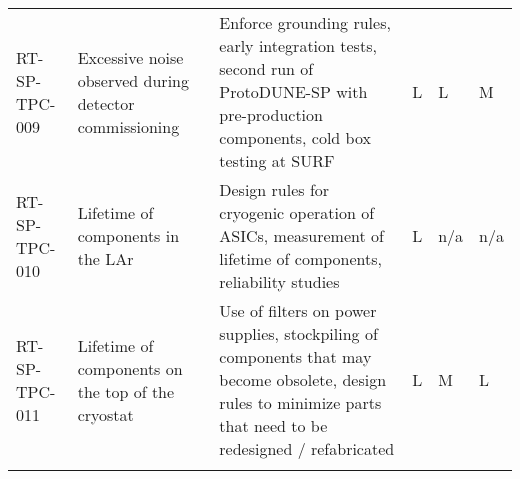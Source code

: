 \begin{footnotesize}
\begin{longtable}{P{0.18\textwidth}P{0.20\textwidth}P{0.32\textwidth}P{0.02\textwidth}P{0.02\textwidth}P{0.02\textwidth}}
RT-SP-TPC-009 & Excessive noise observed during detector commissioning & Enforce grounding rules, early integration tests, second run of ProtoDUNE-SP with pre-production components, cold box testing at SURF & L & L & M \\  \colhline
RT-SP-TPC-010 & Lifetime of components in the LAr & Design rules for cryogenic operation of ASICs, measurement of lifetime of components, reliability studies & L & n/a & n/a \\  \colhline
RT-SP-TPC-011 & Lifetime of components on the top of the cryostat & Use of filters on power supplies, stockpiling of components that may become obsolete, design rules to minimize parts that need to be redesigned / refabricated & L & M & L \\  \colhline

\label{tab:risks:SP-FD-TPCELEC}
\end{longtable}
\end{footnotesize}